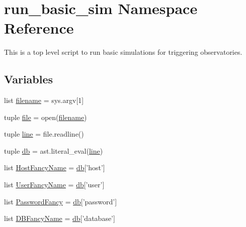 \hypertarget{namespacerun__basic__sim}{\section{run\-\_\-basic\-\_\-sim Namespace Reference}
\label{namespacerun__basic__sim}
}


\begin{DoxyVerb} This is a top level script to run basic
 simulations for triggering observatories.\end{DoxyVerb}
  


\subsection*{Variables}
\begin{DoxyCompactItemize}
\item 
list \hyperlink{namespacerun__basic__sim_a46e83bb8198f44baffa872d1a3b1570f}{filename} = sys.\-argv\mbox{[}1\mbox{]}
\item 
tuple \hyperlink{namespacerun__basic__sim_a6afc5df7c72945bb7e6876aae0c91c0e}{file} = open(\hyperlink{namespacerun__basic__sim_a46e83bb8198f44baffa872d1a3b1570f}{filename})
\item 
tuple \hyperlink{namespacerun__basic__sim_a5d0bbfc63b171c2cc6e2ce7fcdde8ae0}{line} = file.\-readline()
\item 
tuple \hyperlink{namespacerun__basic__sim_a5db58d711903c4ee3e7e9450e4d37108}{db} = ast.\-literal\-\_\-eval(\hyperlink{namespacerun__basic__sim_a5d0bbfc63b171c2cc6e2ce7fcdde8ae0}{line})
\item 
list \hyperlink{namespacerun__basic__sim_a9ab53f200ea60af8c1febff5dad1e818}{Host\-Fancy\-Name} = \hyperlink{namespacerun__basic__sim_a5db58d711903c4ee3e7e9450e4d37108}{db}\mbox{[}'host'\mbox{]}
\item 
list \hyperlink{namespacerun__basic__sim_a60114f9226c72a5363daf6abd4e68f3f}{User\-Fancy\-Name} = \hyperlink{namespacerun__basic__sim_a5db58d711903c4ee3e7e9450e4d37108}{db}\mbox{[}'user'\mbox{]}
\item 
list \hyperlink{namespacerun__basic__sim_adfaf4423db91486ada36676529e1dc5d}{Password\-Fancy} = \hyperlink{namespacerun__basic__sim_a5db58d711903c4ee3e7e9450e4d37108}{db}\mbox{[}'password'\mbox{]}
\item 
list \hyperlink{namespacerun__basic__sim_a1fe2db74b7d731cfc500bb312576f95f}{D\-B\-Fancy\-Name} = \hyperlink{namespacerun__basic__sim_a5db58d711903c4ee3e7e9450e4d37108}{db}\mbox{[}'database'\mbox{]}

\end{DoxyCompactItemize}
